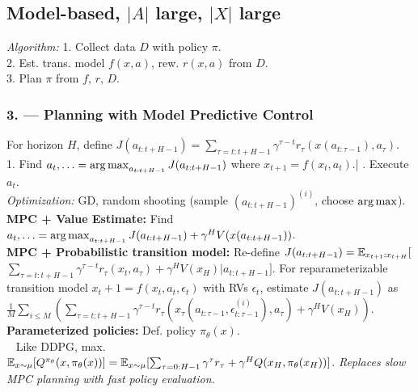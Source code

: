 \subsection*{Model-based, $|A|$ large, $|X|$ large}
\emph{Algorithm:} 1. Collect data $D$ with policy $\pi$.\\
2. Est. trans. model $f(x,a)$, rew. $r(x,a)$ from $D$.\\
3. Plan $\pi$ from $f$, $r$, $D$.{\tiny\CircArrowRight{}}
\subsubsection*{3. --- Planning with Model Predictive Control}
For horizon $H$, define $J(a_{t:t+H-1})=\sum_{\tau=t:t+H-1}\gamma^{\tau-t}r_\tau(x(a_{t:\tau-1}), a_\tau)$.\\
1. Find $a_t,\ldots = \operatorname*{arg\,max}_{a_{t:t+H-1}}J(a_{t:t+H-1})$ where
$x_{t+1} = f(x_t, a_t)$.\quad | . Execute $a_t$.{\tiny\CircArrowRight{}}\\
\emph{Optimization:} GD, random shooting (sample $(a_{t:{t+H-1}})^{(i)}$, choose $\color{black}\operatorname*{arg\,max}$).\\
\textbf{MPC + Value Estimate:} Find $a_t,\ldots = \operatorname*{arg\,max}_{a_{t:t+H-1}}J(a_{t:t+H-1})+\gamma^H V(x(a_{t:t+H-1}))$.\\
\textbf{MPC + Probabilistic transition model:}
Re-define $J(a_{t:t+H-1})=\mathbb{E}_{x_{t+1}:x_{t+H}}[$\\$\sum_{\tau=t:t+H-1}\gamma^{\tau-t}r_\tau(x_t, a_\tau)+\gamma^H V(x_{H})|a_{t:t+H-1}]$. For reparameterizable transition model $x_t+1 = f(x_t,a_t,\epsilon_t)$ with RVs $\epsilon_t$, estimate 
$J(a_{t:t+H-1})$ as $\frac{1}{M}\sum_{i\leq M}(\sum_{\tau=t:t+H-1}\gamma^{\tau-t}r_\tau(x_\tau(a_{t:\tau-1},\epsilon^{(i)}_{t:\tau-1}), a_\tau)+\gamma^H V(x_{H}))$.\\
\textbf{Parameterized policies:}
Def. policy $\pi_\theta(x)$.\\
\hphantom\,\,\,\,\,Like DDPG, max. $\mathbb{E}_{x\sim\mu}[Q^{\pi_\theta}(x,\pi_\theta(x))] = \mathbb{E}_{x\sim\mu}[\sum_{\tau=0:H-1}\gamma^\tau r_\tau + \gamma^H Q(x_{H}, \pi_\theta(x_H))]$.
\emph{Replaces slow MPC planning with fast policy evaluation.}

